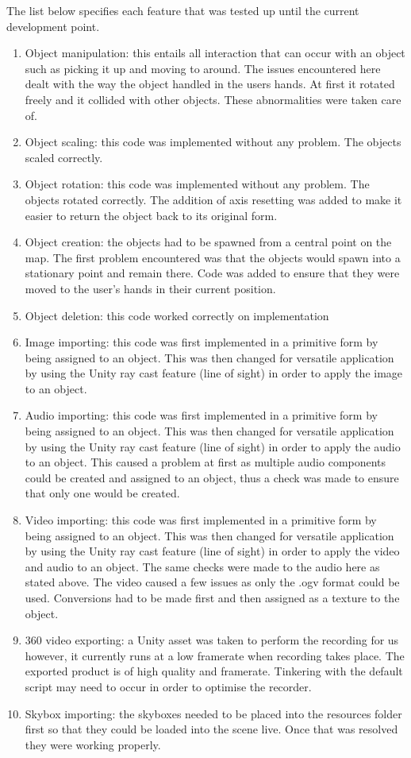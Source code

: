 \documentclass{article}
\begin{document}
	\begin{flushleft}
		The list below specifies each feature that was tested up until the current development point.
		\begin{enumerate}
			\item Object manipulation: this entails all interaction that can occur with an object such as picking it up and moving to around. The issues encountered here
			dealt with the way the object handled in the users hands. At first it rotated freely and it collided with other objects. These abnormalities were taken care of.
			\item Object scaling: this code was implemented without any problem. The objects scaled correctly.
			\item Object rotation: this code was implemented without any problem. The objects rotated correctly. The addition of axis resetting was added to make it easier
			to return the object back to its original form.
			\item Object creation: the objects had to be spawned from a central point on the map. The first problem encountered was that the objects would spawn into a stationary
			point and remain there. Code was added to ensure that they were moved to the user's hands in their current position.
			\item Object deletion: this code worked correctly on implementation
		 	\item Image importing: this code was first implemented in a primitive form by being assigned to an object. This was then changed for versatile application by using the Unity
			ray cast feature (line of sight) in order to apply the image to an object.
			\item Audio importing: this code was first implemented in a primitive form by being assigned to an object. This was then changed for versatile application by using the Unity
			ray cast feature (line of sight) in order to apply the audio to an object. This caused a problem at first as multiple audio components could be created and assigned to an
			object, thus a check was made to ensure that only one would be created.
			\item Video importing: this code was first implemented in a primitive form by being assigned to an object. This was then changed for versatile application by using the Unity
			ray cast feature (line of sight) in order to apply the video and audio to an object. The same checks were made to the audio here as stated above. The video caused a few issues
			as only the .ogv format could be used. Conversions had to be made first and then assigned as a texture to the object.
			\item 360 video exporting: a Unity asset was taken to perform the recording for us however, it currently runs at a low framerate when recording takes place. The exported product
			is of high quality and framerate. Tinkering with the default script may need to occur in order to optimise the recorder.
			\item Skybox importing: the skyboxes needed to be placed into the resources folder first so that they could be loaded into the scene live. Once that was resolved they were working
			properly.
		\end{enumerate}
	\end{flushleft}
\end{document}
